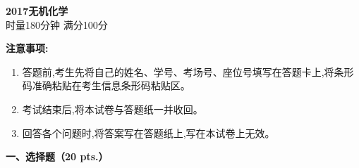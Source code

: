 \begin{center}
    {\LARGE \textbf{2017无机化学}} \\[2ex]
    {\large 时量180分钟 \quad 满分100分}
\end{center}

\vspace{0.5cm}
\noindent\textbf{注意事项:}
\begin{enumerate}[label=\arabic*., parsep=0pt, itemsep=0pt]
    \item 答题前,考生先将自己的姓名、学号、考场号、座位号填写在答题卡上,将条形码准确粘贴在考生信息条形码粘贴区。
    \item 考试结束后,将本试卷与答题纸一并收回。
    \item 回答各个问题时,将答案写在答题纸上,写在本试卷上无效。
\end{enumerate}

\vspace{0.5cm}
\noindent\textbf{一、选择题（20 pts.）}

